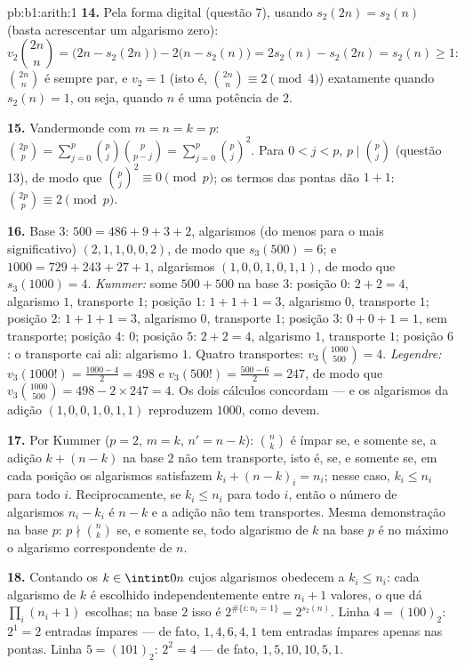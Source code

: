 \begin{solution}{pb:b1:arith:1}
\textbf{14.} Pela forma digital (questão 7), usando $s_2(2n) =
s_2(n)$ (basta acrescentar um algarismo zero):
\[
v_2\binom{2n}n = \bigl(2n - s_2(2n)\bigr) - 2\bigl(n -
s_2(n)\bigr) = 2s_2(n) - s_2(2n) = s_2(n) \geq 1 :
\]
$\binom{2n}n$ é sempre par, e $v_2 = 1$ (isto é, $\binom{2n}n
\equiv 2 \pmod 4$) exatamente quando $s_2(n) = 1$, ou seja, quando $n$ é
uma potência de $2$.

\textbf{15.} Vandermonde com $m = n = k = p$: $\binom{2p}p =
\sum_{j=0}^p \binom pj\binom p{p-j} = \sum_{j=0}^p \binom pj^2$.
Para $0 < j < p$, $p \mid \binom pj$ (questão 13), de modo que $\binom
pj^2 \equiv 0 \pmod p$; os termos das pontas dão $1 + 1$:
$\binom{2p}p \equiv 2 \pmod p$.

\textbf{16.} Base $3$: $500 = 486 + 9 + 3 + 2$, algarismos (do menos para o
mais significativo) $(2, 1, 1, 0, 0, 2)$, de modo que $s_3(500) = 6$; e $1000 = 729 +
243 + 27 + 1$, algarismos $(1, 0, 0, 1, 0, 1, 1)$, de modo que $s_3(1000) = 4$.
\emph{Kummer:} some $500 + 500$ na base $3$: posição $0$: $2 + 2 =
4$, algarismo $1$, transporte $1$; posição $1$: $1 + 1 + 1 = 3$, algarismo $0$,
transporte $1$; posição $2$: $1 + 1 + 1 = 3$, algarismo $0$, transporte $1$;
posição $3$: $0 + 0 + 1 = 1$, sem transporte; posição $4$: $0$;
posição $5$: $2 + 2 = 4$, algarismo $1$, transporte $1$; posição $6$:
o transporte cai ali: algarismo $1$. Quatro transportes: $v_3\binom{1000}{500} = 4$.
\emph{Legendre:} $v_3(1000!) = \frac{1000 - 4}2 = 498$ e
$v_3(500!) = \frac{500 - 6}2 = 247$, de modo que $v_3\binom{1000}{500} =
498 - 2\times247 = 4$. Os dois cálculos concordam --- e os
algarismos da adição $(1, 0, 0, 1, 0, 1, 1)$ reproduzem $1000$, como
devem.

\textbf{17.} Por Kummer ($p = 2$, $m = k$, $n' = n - k$):
$\binom nk$ é ímpar se, e somente se, a adição $k + (n - k)$ na base $2$ não
tem transporte, isto é, se, e somente se, em cada posição os algarismos
satisfazem $k_i + (n -
k)_i = n_i$; nesse caso, $k_i \leq n_i$ para todo $i$. Reciprocamente,
se $k_i \leq n_i$ para todo $i$, então o número de algarismos $n_i -
k_i$ é $n - k$ e a adição não tem transportes. Mesma demonstração na
base $p$: $p \nmid \binom nk$ se, e somente se, todo algarismo de $k$ na
base $p$ é no máximo o algarismo correspondente de $n$.

\textbf{18.} Contando os $k \in \intint0n$ cujos algarismos obedecem a
$k_i \leq n_i$: cada algarismo de $k$ é escolhido independentemente entre
$n_i + 1$ valores, o que dá $\prod_i (n_i + 1)$ escolhas; na base $2$
isso é $2^{\#\{i : n_i = 1\}} = 2^{s_2(n)}$. Linha $4 =
(100)_2$: $2^1 = 2$ entradas ímpares --- de fato, $1, 4, 6, 4, 1$ tem entradas
ímpares apenas nas pontas. Linha $5 = (101)_2$: $2^2 = 4$ --- de fato,
$1, 5, 10, 10, 5, 1$.


\end{solution}
